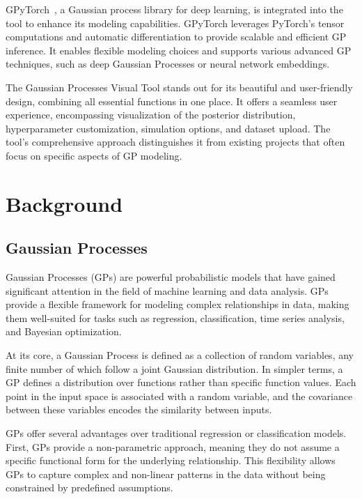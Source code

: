 \documentclass[preprint,journal]{vgtc}       %
\begin{document}
GPyTorch~\cite{gardner2018gpytorch}, a Gaussian process library for deep learning, is integrated into the tool to enhance its modeling capabilities. GPyTorch leverages PyTorch's tensor computations and automatic differentiation to provide scalable and efficient GP inference. It enables flexible modeling choices and supports various advanced GP techniques, such as deep Gaussian Processes or neural network embeddings.

The Gaussian Processes Visual Tool stands out for its beautiful and user-friendly design, combining all essential functions in one place. It offers a seamless user experience, encompassing visualization of the posterior distribution, hyperparameter customization, simulation options, and dataset upload. The tool's comprehensive approach distinguishes it from existing projects that often focus on specific aspects of GP modeling.

\section{Background}

\subsection{Gaussian Processes}

Gaussian Processes (GPs) are powerful probabilistic models that have gained significant attention in the field of machine learning and data analysis. GPs provide a flexible framework for modeling complex relationships in data, making them well-suited for tasks such as regression, classification, time series analysis, and Bayesian optimization.

At its core, a Gaussian Process is defined as a collection of random variables, any finite number of which follow a joint Gaussian distribution. In simpler terms, a GP defines a distribution over functions rather than specific function values. Each point in the input space is associated with a random variable, and the covariance between these variables encodes the similarity between inputs.

GPs offer several advantages over traditional regression or classification models. First, GPs provide a non-parametric approach, meaning they do not assume a specific functional form for the underlying relationship. This flexibility allows GPs to capture complex and non-linear patterns in the data without being constrained by predefined assumptions.
\end{document}
